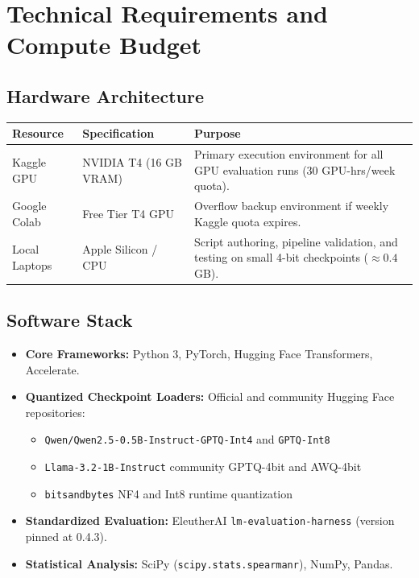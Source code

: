 \documentclass[12pt, a4paper]{article}
\begin{document}
\section{Technical Requirements and Compute Budget}

\subsection{Hardware Architecture}
\begin{table}[h!]
    \centering
    \renewcommand{\arraystretch}{1.2}
    \begin{tabular}{@{}llp{8cm}@{}}
    \toprule
    \textbf{Resource} & \textbf{Specification} & \textbf{Purpose} \\
    \midrule
    Kaggle GPU & NVIDIA T4 (16 GB VRAM) & Primary execution environment for all GPU evaluation runs (30 GPU-hrs/week quota). \\
    Google Colab & Free Tier T4 GPU & Overflow backup environment if weekly Kaggle quota expires. \\
    Local Laptops & Apple Silicon / CPU & Script authoring, pipeline validation, and testing on small 4-bit checkpoints ($\approx 0.4$ GB). \\
    \bottomrule
    \end{tabular}
\end{table}

\subsection{Software Stack}
\begin{itemize}[leftmargin=*]
    \item \textbf{Core Frameworks:} Python 3, PyTorch, Hugging Face Transformers, Accelerate.
    \item \textbf{Quantized Checkpoint Loaders:} Official and community Hugging Face repositories:
    \begin{itemize}
        \item \texttt{Qwen/Qwen2.5-0.5B-Instruct-GPTQ-Int4} and \texttt{GPTQ-Int8}
        \item \texttt{Llama-3.2-1B-Instruct} community GPTQ-4bit and AWQ-4bit
        \item \texttt{bitsandbytes} NF4 and Int8 runtime quantization
    \end{itemize}
    \item \textbf{Standardized Evaluation:} EleutherAI \texttt{lm-evaluation-harness} (version pinned at 0.4.3).
    \item \textbf{Statistical Analysis:} SciPy (\texttt{scipy.stats.spearmanr}), NumPy, Pandas.
\end{itemize}
\end{document}
